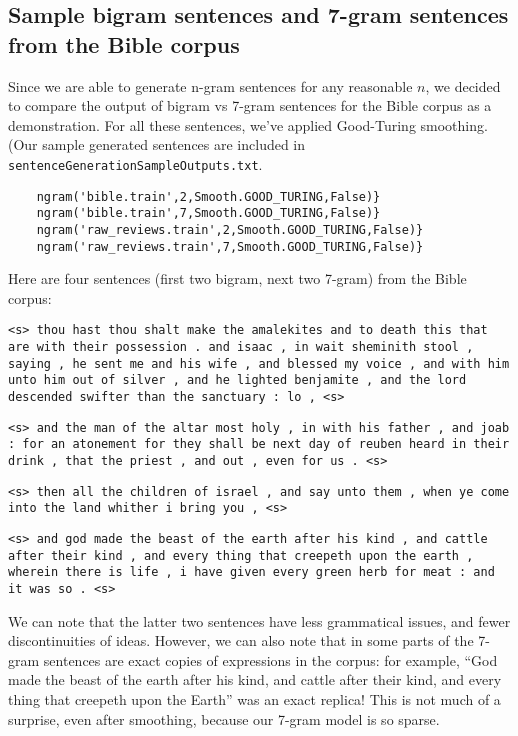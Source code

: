 \documentclass{article}
\begin{document}
\subsection{Sample bigram sentences and 7-gram sentences from the Bible corpus}
Since we are able to generate n-gram sentences for any reasonable $n$, we decided to compare the output of bigram vs 7-gram sentences for the Bible corpus as a demonstration. For all these sentences, we've applied Good-Turing smoothing. (Our sample generated sentences are included in \texttt{sentenceGenerationSampleOutputs.txt}.
\begin{verbatim}
    ngram('bible.train',2,Smooth.GOOD_TURING,False)}
    ngram('bible.train',7,Smooth.GOOD_TURING,False)}
    ngram('raw_reviews.train',2,Smooth.GOOD_TURING,False)}
    ngram('raw_reviews.train',7,Smooth.GOOD_TURING,False)}
\end{verbatim}

\begin{adjustwidth}{0.25in}{0.5in}
\setlength{\parindent}{-0.15in}
Here are four sentences (first two bigram, next two 7-gram) from the Bible corpus:\par
{\small
\texttt{<s> thou hast thou shalt make the amalekites and to death this that are with their possession . and isaac , in wait sheminith stool , saying , he sent me and his wife , and blessed my voice , and with him unto him out of silver , and he lighted benjamite , and the lord descended swifter than the sanctuary : lo , <s>}\par
\texttt{<s> and the man of the altar most holy , in with his father , and joab : for an atonement for they shall be next day of reuben heard in their drink , that the priest , and out , even for us . <s>}\par\smallskip

\texttt{<s> then all the children of israel , and say unto them , when ye come into the land whither i bring you , <s>}\par
\texttt{<s> and god made the beast of the earth after his kind , and cattle after their kind , and every thing that creepeth upon the earth , wherein there is life , i have given every green herb for meat : and it was so . <s>}\par\smallskip
}
We can note that the latter two sentences have less grammatical issues, and fewer discontinuities of ideas. However, we can also note that in some parts of the 7-gram sentences are exact copies of expressions in the corpus: for example, ``God made the beast of the earth after his kind, and cattle
after their kind, and every thing that creepeth upon the Earth'' was an exact replica! This is not much of a surprise, even after smoothing, because our 7-gram model is so sparse.
\end{adjustwidth}
\end{document}
